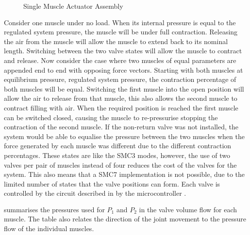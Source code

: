 \documentclass[11pt,a4paper]{article}
\begin{document}
\begin{figure}[!hbt]
{
    }
    \caption{Single Muscle Actuator Assembly}
    \label{fig:pneumatic_valve}
\end{figure}

Consider one muscle under no load. When its internal pressure is equal to the regulated system pressure, the muscle will be under full contraction. Releasing the air from the muscle will allow the muscle to extend back to its nominal length. Switching between the two valve states will allow the muscle to contract and release. 
Now consider the case where two muscles of equal parameters are appended end to end with opposing force vectors. Starting with both muscles at equilibrium pressure, regulated system pressure, the contraction percentage of both muscles will be equal. Switching the first muscle into the open position will allow the air to release from that muscle, this also allows the second muscle to contract filling with air. When the required position is reached the first muscle can be switched closed, causing the muscle to re-pressurise stopping the contraction of the second muscle. 
If the non-return valve was not installed, the system would be able to equalise the pressure between the two muscles when the force generated by each muscle was different due to the different contraction percentages. These states  are like the SMC3 modes, however, the use of two valves per pair of muscles instead of four reduces the cost of the valves for the system. This also means that a SMC7 implementation is not possible, due to the limited number of states that the valve positions can form.
Each valve is controlled by the circuit described in  by the microcontroller . \newline

 summarises the pressures used for $P_1$ and $P_2$ in the valve volume flow  for each muscle. The table also relates the direction of the joint movement to the pressure flow of the individual muscles.
\end{document}
